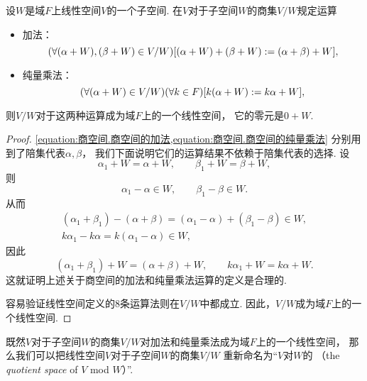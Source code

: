 \begin{theorem}\label{theorem:商空间.商空间的线性运算}
设\(W\)是域\(F\)上线性空间\(V\)的一个子空间.
在\(V\)对于子空间\(W\)的商集\(V/W\)规定运算\begin{itemize}
	\item 加法：\begin{equation}\label{equation:商空间.商空间的加法}
		(\forall(\alpha+W),(\beta+W)\in V/W)[(\alpha+W) + (\beta+W) := (\alpha+\beta)+W],
	\end{equation}
	\item 纯量乘法：\begin{equation}\label{equation:商空间.商空间的纯量乘法}
		(\forall(\alpha+W)\in V/W)(\forall k \in F)[k(\alpha+W) := k\alpha+W],
	\end{equation}
\end{itemize}
则\(V/W\)对于这两种运算成为域\(F\)上的一个线性空间，
它的零元是\(0+W\).
\begin{proof}
\cref{equation:商空间.商空间的加法,equation:商空间.商空间的纯量乘法}
分别用到了陪集代表\(\alpha,\beta\)，
我们下面说明它们的运算结果不依赖于陪集代表的选择.
设\[
	\alpha_1 + W = \alpha + W,
	\qquad
	\beta_1 + W = \beta + W,
\]
则\[
	\alpha_1 - \alpha \in W,
	\qquad
	\beta_1 - \beta \in W.
\]
从而\begin{gather*}
	(\alpha_1 + \beta_1) - (\alpha + \beta)
	= (\alpha_1 - \alpha) + (\beta_1 - \beta)
	\in W, \\
	k \alpha_1 - k \alpha
	= k (\alpha_1 - \alpha)
	\in W,
\end{gather*}
因此\[
	(\alpha_1 + \beta_1) + W
	= (\alpha + \beta) + W,
	\qquad
	k \alpha_1 + W
	= k \alpha + W.
\]
这就证明上述关于商空间的加法和纯量乘法运算的定义是合理的.

容易验证线性空间定义的8条运算法则在\(V/W\)中都成立.
因此，\(V/W\)成为域\(F\)上的一个线性空间.
\end{proof}
\end{theorem}

既然\(V\)对于子空间\(W\)的商集\(V/W\)对加法和纯量乘法成为域\(F\)上的一个线性空间，
那么我们可以把线性空间\(V\)对于子空间\(W\)的商集\(V/W\)
重新命名为“\(V\)对\(W\)的%
（the \emph{quotient space} of \(V\) mod \(W\)）”.

